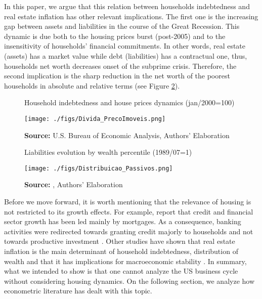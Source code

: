 \documentclass[12pt, a4]{article}
\begin{document}
In this paper, we argue that this relation between households indebtedness and real estate inflation has other relevant implications.
The first one is the increasing gap between assets and liabilities in the course of the Great Recession.
This dynamic is due both to the housing prices burst (post-2005) and to the insensitivity of households' financial commitments.
In other words, real estate (assets) has a market value while debt (liabilities) has a contractual one, thus, households net worth decreases onset of the subprime crisis.
Therefore, the second implication is the sharp reduction in the net worth of the poorest households in absolute and relative terms (see Figure \ref{FigDistPassivos}).

\begin{figure}[H]
	\centering
	\caption{Household indebtedness and house prices dynamics (jan/2000=100)}
	\label{FigDividaPreco}
	\texttt{[image: ./figs/Divida\_PrecoImoveis.png]}
	\caption*{\textbf{Source:} U.S. Bureau of Economic Analysis, Authors' Elaboration}
\end{figure}

\begin{figure}[H]
	\centering
	\caption{Liabilities evolution by wealth percentile (1989/07=1)}
	\label{FigDistPassivos}
	\texttt{[image: ./figs/Distribuicao\_Passivos.png]}
	\caption*{\textbf{Source:} \textcite{us_census_bureau_characteristics_2017}, Authors' Elaboration}
\end{figure}



Before we move forward, it is worth mentioning that the relevance of housing is not restricted to its growth effects. 
For example, \textcite{jorda_great_2016} report that credit and financial sector growth has been led mainly by mortgages. 
As a consequence, banking activities were redirected towards granting credit majorly to households and not towards productive investment \cites{erturk_banks_2007}{kohl_more_2018}.
Other studies have shown that real estate inflation is the main determinant of household indebtedness, distribution of wealth and that it has implications for macroeconomic stability \cites{ryoo_household_2015}{stockhammer_debt-driven_2016}{barnes_private_2016}{johnston_global_2017}{mian_household_2017}{anderson_politics_2020}{fuller_housing_2020}. 
In summary, what we intended to show is that one cannot analyze the US business cycle without considering housing dynamics.
On the following section, we analyze how econometric literature has dealt with this topic.
\end{document}
